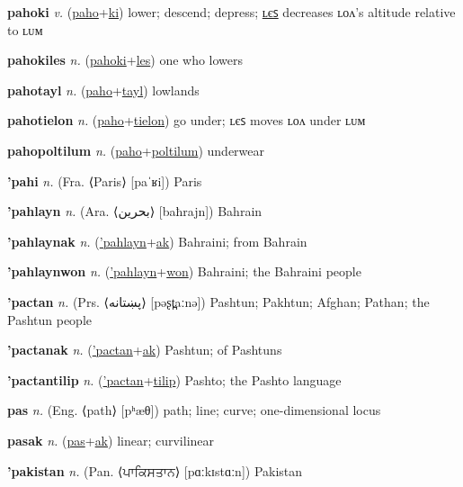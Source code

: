 \textbf{\hypertarget{pahoki}{pahoki}} \textit{v.} (\hyperlink{paho}{paho}+\allowbreak \hyperlink{ki}{ki})
lower; descend; depress; \hyperlink{pahokiles}{ʟєꜱ} decreases ʟᴏᴧ’s altitude relative to ʟᴜᴍ

\textbf{\hypertarget{pahokiles}{pahokiles}} \textit{n.} (\hyperlink{pahoki}{pahoki}+\allowbreak \hyperlink{les}{les})
one who lowers

\textbf{\hypertarget{pahotayl}{pahotayl}} \textit{n.} (\hyperlink{paho}{paho}+\allowbreak \hyperlink{tayl}{tayl})
lowlands

\textbf{\hypertarget{pahotielon}{pahotielon}} \textit{n.} (\hyperlink{paho}{paho}+\allowbreak \hyperlink{tielon}{tielon})
go under; ʟєꜱ moves ʟᴏᴧ under ʟᴜᴍ

\textbf{\hypertarget{pahopoltilum}{pahopoltilum}} \textit{n.} (\hyperlink{paho}{paho}+\allowbreak \hyperlink{poltilum}{poltilum})
underwear

\textbf{\hypertarget{'pahi}{'pahi}} \textit{n.} (Fra. ⟨Paris⟩ [paˈʁi])
Paris

\textbf{\hypertarget{'pahlayn}{'pahlayn}} \textit{n.} (Ara. ⟨{\arabics{}بحرين‎}⟩ [baħrajn])
Bahrain

\textbf{\hypertarget{'pahlaynak}{'pahlaynak}} \textit{n.} (\hyperlink{'pahlayn}{'pahlayn}+\allowbreak \hyperlink{ak}{ak})
Bahraini; from Bahrain

\textbf{\hypertarget{'pahlaynwon}{'pahlaynwon}} \textit{n.} (\hyperlink{'pahlayn}{'pahlayn}+\allowbreak \hyperlink{won}{won})
Bahraini; the Bahraini people

\textbf{\hypertarget{'pactan}{'pactan}} \textit{n.} (Prs. ⟨{\arabics{}پښتانه‎‎}⟩ [pəʂt̪aːnə])
Pashtun; Pakhtun; Afghan; Pathan; the Pashtun people

\textbf{\hypertarget{'pactanak}{'pactanak}} \textit{n.} (\hyperlink{'pactan}{'pactan}+\allowbreak \hyperlink{ak}{ak})
Pashtun; of Pashtuns

\textbf{\hypertarget{'pactantilip}{'pactantilip}} \textit{n.} (\hyperlink{'pactan}{'pactan}+\allowbreak \hyperlink{tilip}{tilip})
Pashto; the Pashto language

\textbf{\hypertarget{pas}{pas}} \textit{n.} (Eng. ⟨path⟩ [pʰæθ])
path; line; curve; one-dimensional locus

\textbf{\hypertarget{pasak}{pasak}} \textit{n.} (\hyperlink{pas}{pas}+\allowbreak \hyperlink{ak}{ak})
linear; curvilinear

\textbf{\hypertarget{'pakistan}{'pakistan}} \textit{n.} (Pan. ⟨{\gurmukhi{}ਪਾਕਿਸਤਾਨ‎}⟩ [pɑːkɪstɑːn])
Pakistan

